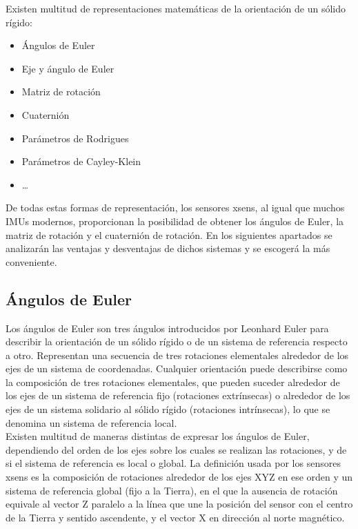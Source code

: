 \documentclass[12pt, a4paper]{report}
\begin{document}
Existen multitud de representaciones matemáticas de la orientación de un sólido rígido:

\begin{itemize}

\item Ángulos de Euler
\item Eje y ángulo de Euler
\item Matriz de rotación
\item Cuaternión
\item Parámetros de Rodrigues
\item Parámetros de Cayley-Klein
\item \ldots

\end{itemize}

De todas estas formas de representación, los sensores xsens, al igual que muchos IMUs modernos, proporcionan la posibilidad de obtener los ángulos de Euler, la matriz de rotación y el cuaternión de rotación. En los siguientes apartados se analizarán las ventajas y desventajas de dichos sistemas y se escogerá la más conveniente.

\subsection{Ángulos de Euler}

Los ángulos de Euler son tres ángulos introducidos por Leonhard Euler para describir la orientación de un sólido rígido o de un sistema de referencia respecto a otro. Representan una secuencia de tres rotaciones elementales alrededor de los ejes de un sistema de coordenadas. Cualquier orientación puede describirse como la composición de tres rotaciones elementales, que pueden suceder alrededor de los ejes de un sistema de referencia fijo (rotaciones extrínsecas) o alrededor de los ejes de un sistema solidario al sólido rígido (rotaciones intrínsecas), lo que se denomina un sistema de referencia local. \\

Existen multitud de maneras distintas de expresar los ángulos de Euler, dependiendo del orden de los ejes sobre los cuales se realizan las rotaciones, y de si el sistema de referencia es local o global. La definición usada por los sensores xsens es la composición de rotaciones alrededor de los ejes XYZ en ese orden y un sistema de referencia global (fijo a la Tierra), en el que la ausencia de rotación equivale al vector Z paralelo a la línea que une la posición del sensor con el centro de la Tierra y sentido ascendente, y el vector X en dirección al norte magnético. \\
\end{document}
